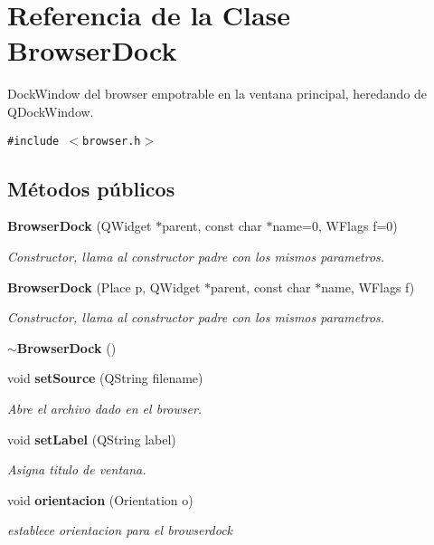 \section{Referencia de la Clase Browser\-Dock}
\label{classBrowserDock}
Dock\-Window del browser empotrable en la ventana principal, heredando de QDock\-Window.  


{\tt \#include $<$browser.h$>$}

\subsection*{M\'{e}todos p\'{u}blicos}
\begin{CompactItemize}
\item 
{\bf Browser\-Dock} (QWidget $\ast$parent, const char $\ast$name=0, WFlags f=0)
\begin{CompactList}\small\item\em Constructor, llama al constructor padre con los mismos parametros. \item\end{CompactList}\item 
{\bf Browser\-Dock} (Place p, QWidget $\ast$parent, const char $\ast$name, WFlags f)
\begin{CompactList}\small\item\em Constructor, llama al constructor padre con los mismos parametros. \item\end{CompactList}\item 
{\bf $\sim$Browser\-Dock} ()
\item 
void {\bf set\-Source} (QString filename)
\begin{CompactList}\small\item\em Abre el archivo dado en el browser. \item\end{CompactList}\item 
void {\bf set\-Label} (QString label)
\begin{CompactList}\small\item\em Asigna titulo de ventana. \item\end{CompactList}\item 
void {\bf orientacion} (Orientation o)
\begin{CompactList}\small\item\em establece orientacion para el browserdock \item\end{CompactList}\end{CompactItemize}
